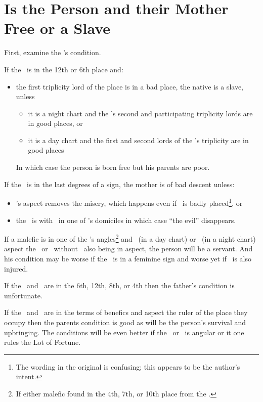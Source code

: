 \section{Is the Person and their Mother Free or a Slave}

First, examine the \Moon's condition. 

If the \Moon\, is in the 12th or 6th place and:
\begin{itemize}[topsep=0em, itemsep=0em]
\item the first triplicity lord of the place is in a bad place, the native is a slave, unless
\begin{itemize}[topsep=0em, itemsep=0em]
\item it is a night chart and the \Moon's second and participating triplicity lords are in good places, or
\item it is a day chart and the first and second lords of the \Sun's triplicity are in good places
\end{itemize}
In which case the person is born free but his parents are poor.
\end{itemize}

If the \Moon\, is in the last degrees of a sign, the mother is of bad descent unless:
\begin{itemize}[topsep=0em, itemsep=0em]
\item  \Jupiter's aspect removes the misery, which happens even if \Jupiter\, is badly placed\footnote{The wording in the original is confusing; this appears to be the author's intent.}, or

\item the \Moon\, is with \Venus\, in one of \Venus's domiciles in which case ``the evil'' disappears.
\end{itemize}

If a malefic is in one of the \Moon's angles\footnote{If either malefic found in the 4th, 7th, or 10th place from the \Moon.} and \Mars\, (in a day chart) or \Saturn\, (in a night chart) aspect the \Sun\, or \Moon\, without \Jupiter\, also being in aspect, the person will be a servant. And his condition may be worse if the \Moon\, is in a feminine sign and worse yet if \Venus\, is also injured.

If the \Sun\, and \Saturn\, are in the 6th, 12th, 8th, or 4th then the father's condition is unfortunate.

If the \Sun\, and \Moon\, are in the terms of benefics and aspect the ruler of the place they occupy then the parents condition is good as will be the person's survival and upbringing. The conditions will be even better if  the \Sun\, or \Moon\, is angular or it one rules the Lot of Fortune.

